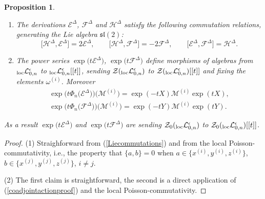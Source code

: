 \documentclass[pdftex]{sigma}%
\numberwithin{equation}{section}
\numberwithin{figure}{section}
\newtheorem{prop}[teo]{Proposition}
\newcommand{\e}{\epsilon}
\newcommand{\Ll}{{\mathcal L}}
\begin{document}
\begin{prop}\label{convexpn} \quad

\begin{enumerate}\itemsep=0pt

\item[$(1)$] The derivations ${\mathcal E}^{\Delta}$, ${\mathcal F}^{\Delta}$ and ${\mathcal H}^{\Delta}$ satisfy the following commutation relations, generating the Lie algebra ${\mathfrak{sl}}(2)$:
\begin{equation*}
\big[\mathcal{H}^{\Delta},\mathcal{E}^{\Delta}\big]=2\mathcal{E}^{\Delta}, \qquad \big[\mathcal{H}^{\Delta},\mathcal{F}^{\Delta}\big]=-2\mathcal{F}^{\Delta}, \qquad \big[\mathcal{E}^{\Delta},\mathcal{F}^{\Delta}\big]=\mathcal{H}^{\Delta}.
\end{equation*}

\item[$(2)$] The power series $\exp\big(t{\mathcal E}^{\Delta}\big)$, $ \exp\big(t{\mathcal F}^{\Delta}\big)$ define morphisms of algebras from ${}_{\rm loc}{\Ll}_{0,n}^\e$ to \allowbreak ${}_{\rm loc}{\Ll}_{0,n}^\e[[t]]$, sending ${\mathcal{Z}}({}_{\rm loc}\Ll_{0,n}^\epsilon)$ to ${\mathcal{Z}}({}_{\rm loc}\Ll_{0,n}^\epsilon)[[t]]$ and fixing the elements $\omega^{(i)}$. Moreover
\begin{gather*}
\exp\big(t\Phi_n\big({\mathcal E}^{\Delta}\big)\big)\big({\mathcal M}^{(i)}\big)=\exp(-tX){\mathcal M}^{(i)}\exp(tX),
\\
\exp\big(t\Phi_n\big({\mathcal F}^\Delta\big)\big)\big({\mathcal M}^{(i)}\big)=\exp(-tY){\mathcal M}^{(i)}\exp(tY).
\end{gather*}

\end{enumerate}

As a result $\exp\big(t{\mathcal E}^{\Delta}\big)$ and $\exp\big(t{\mathcal F}^{\Delta}\big)$ are sending ${\mathcal{Z}}_0({}_{\rm loc}\Ll_{0,n}^\epsilon)$ to ${\mathcal{Z}}_0({}_{\rm loc}\Ll_{0,n}^\epsilon)[[t]]$.
\end{prop}


\begin{proof} (1) Straighforward from (\ref{Liecommutations}) and from the local Poisson-commutativity, i.e., the pro\-perty that $\{a,b\}=0$ when $a\in \big\{x^{(i)}, y^{(i)}, z^{(i)}\big\}$, $b\in \big\{x^{(j)}, y^{(j)}, z^{(j)}\big\}$, $i\not=j$.

(2) The first claim is straightforward, the second is a direct application of (\ref{coadjointactionproof}) and the local Poisson-commutativity.
\end{proof}
\end{document}
